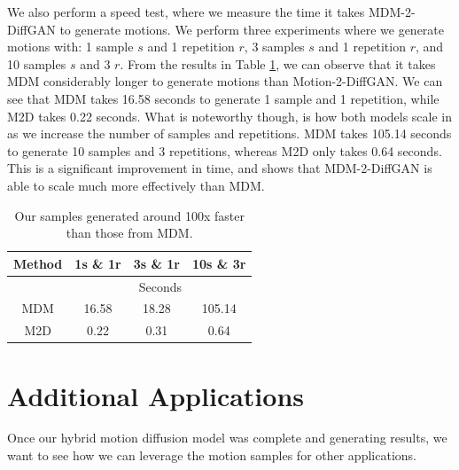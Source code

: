 \documentclass[10pt,twocolumn,letterpaper]{article}
\begin{document}
\newpage

We also perform a speed test, where we measure the time it takes MDM-2-DiffGAN to generate motions. We perform 
three experiments where we generate motions with: 1 sample $s$ and 1 repetition $r$, 3 samples $s$ and 1 repetition $r$, and 10 samples 
$s$ and 3 $r$. From the results in Table \ref{tab:time}, we can observe that it takes MDM considerably longer to generate motions 
than Motion-2-DiffGAN. We can see that MDM takes 16.58 seconds to generate 1 sample and 1 repetition, while M2D takes 0.22 seconds. 
What is noteworthy though, is how both models scale in as we increase the number of samples and repetitions. MDM takes 105.14 seconds 
to generate 10 samples and 3 repetitions, whereas M2D only takes 0.64 seconds. This is a significant improvement in time, and shows that 
MDM-2-DiffGAN is able to scale much more effectively than MDM. 

\begin{table}[]
    \centering
    \begin{tabular}{|c|ccc|}
    \hline
    Method & \multicolumn{1}{c|}{1s \& 1r} & \multicolumn{1}{c|}{3s \& 1r} & 10s \& 3r \\ \hline
           & \multicolumn{3}{c|}{Seconds}                                              \\ \hline
    MDM    & \multicolumn{1}{c|}{16.58}    & \multicolumn{1}{c|}{18.28}    & 105.14    \\ \hline
    M2D    & \multicolumn{1}{c|}{0.22}     & \multicolumn{1}{c|}{0.31}     & 0.64      \\ \hline
    \end{tabular}
    \caption{Our samples generated around 100x faster than those from MDM.}
    \label{tab:time}
\end{table}

\newpage

\section{Additional Applications}
\label{sec:additional-applications}

Once our hybrid motion diffusion model was complete and generating results, we want to see how we can
leverage the motion samples for other applications. 
\end{document}
